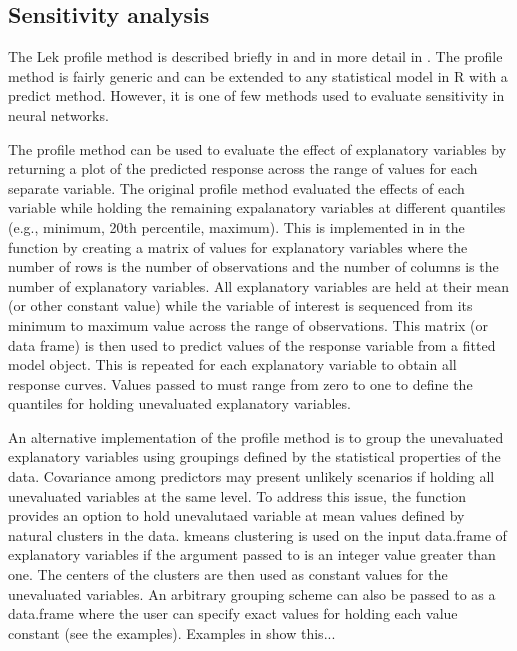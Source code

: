 \documentclass[article,shortnames]{jss}\usepackage[]{graphicx}\usepackage[]{color}
\begin{document}
\subsection{Sensitivity analysis}

The Lek profile method is described briefly in \citet{Lek96} and in more detail in \citet{Gevrey03}. The profile method is fairly generic and can be extended to any statistical model in R with a predict method. However, it is one of few methods used to evaluate sensitivity in neural networks.

The profile method can be used to evaluate the effect of explanatory variables by returning a plot of the predicted response across the range of values for each separate variable. The original profile method evaluated the effects of each variable while holding the remaining expalanatory variables at different quantiles (e.g., minimum, 20th percentile, maximum). This is implemented in in the function by creating a matrix of values for explanatory variables where the number of rows is the number of observations and the number of columns is the number of explanatory variables. All explanatory variables are held at their mean (or other constant value) while the variable of interest is sequenced from its minimum to maximum value across the range of observations. This matrix (or data frame) is then used to predict values of the response variable from a fitted model object. This is repeated for each explanatory variable to obtain all response curves. Values passed to  must range from zero to one to define the quantiles for holding unevaluated explanatory variables.

An alternative implementation of the profile method is to group the unevaluated explanatory variables using groupings defined by the statistical properties of the data. Covariance among predictors may present unlikely scenarios if holding all unevaluated variables at the same level. To address this issue, the function provides an option to hold unevalutaed variable at mean values defined by natural clusters in the data. kmeans clustering is used on the input data.frame of explanatory variables if the argument passed to  is an integer value greater than one. The centers of the clusters are then used as constant values for the unevaluated variables. An arbitrary grouping scheme can also be passed to  as a data.frame where the user can specify exact values for holding each value constant (see the examples).  Examples in \citet{Beck14a} show this...
\end{document}
